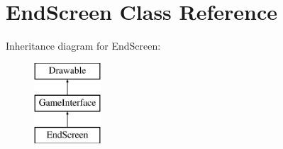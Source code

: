 \hypertarget{class_end_screen}{}\section{End\+Screen Class Reference}
\label{class_end_screen}
Inheritance diagram for End\+Screen\+:\begin{figure}[H]
\begin{center}
\leavevmode
\includegraphics[height=3.000000cm]{class_end_screen}
\end{center}
\end{figure}
